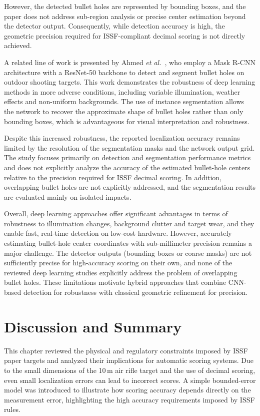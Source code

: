 However, the detected bullet holes are represented by bounding boxes, and the paper does not
address sub-region analysis or precise center estimation beyond the detector output. Consequently,
while detection accuracy is high, the geometric precision required for ISSF-compliant decimal
scoring is not directly achieved.

A related line of work is presented by Ahmed \textit{et al.}~\cite{ahmed2023_maskrcnn_resnet}, who employ a
Mask R-CNN architecture with a ResNet-50 backbone to detect and segment bullet holes on outdoor
shooting targets. This work demonstrates the robustness of deep learning methods in more adverse
conditions, including variable illumination, weather effects and non-uniform backgrounds. The use
of instance segmentation allows the network to recover the approximate shape of bullet holes rather
than only bounding boxes, which is advantageous for visual interpretation and robustness.

Despite this increased robustness, the reported localization accuracy remains limited by the
resolution of the segmentation masks and the network output grid. The study focuses primarily on
detection and segmentation performance metrics and does not explicitly analyze the accuracy of the
estimated bullet-hole centers relative to the precision required for ISSF decimal scoring. In
addition, overlapping bullet holes are not explicitly addressed, and the segmentation results are
evaluated mainly on isolated impacts.

Overall, deep learning approaches offer significant advantages in terms of robustness to illumination
changes, background clutter and target wear, and they enable fast, real-time detection on low-cost
hardware. However, accurately estimating bullet-hole center coordinates with sub-millimeter
precision remains a major challenge. The detector outputs (bounding boxes or coarse masks) are not
sufficiently precise for high-accuracy scoring on their own, and none of the reviewed deep learning
studies explicitly address the problem of overlapping bullet holes. These limitations motivate hybrid
approaches that combine CNN-based detection for robustness with classical geometric refinement for
precision.

\section{Discussion and Summary}
\label{sec:chapter2_summary}

This chapter reviewed the physical and regulatory constraints imposed by ISSF paper targets and
analyzed their implications for automatic scoring systems. Due to the small dimensions of the
10\,m air rifle target and the use of decimal scoring, even small localization errors can lead to
incorrect scores. A simple bounded-error model was introduced to illustrate how scoring accuracy
depends directly on the measurement error, highlighting the high accuracy requirements
imposed by ISSF rules.

